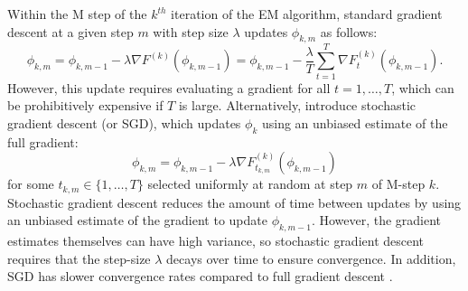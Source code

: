 Within the M step of the $k^{th}$ iteration of the EM algorithm, standard gradient descent at a given step $m$ with step size $\lambda$ updates $\phi_{k,m}$ as follows:
%
\begin{equation}
    \phi_{k,m} = \phi_{k,m-1} - \lambda \nabla F^{(k)}(\phi_{k,m-1}) =  \phi_{k,m-1} - \frac{\lambda}{T} \sum_{t=1}^T \nabla F^{(k)}_t(\phi_{k,m-1}).
\end{equation}
%
However, this update requires evaluating a gradient for all $t = 1,\ldots,T$, which can be prohibitively expensive if $T$ is large. Alternatively, \citet{Robbins:1951} introduce stochastic gradient descent (or SGD), which updates $\phi_k$ using an unbiased estimate of the full gradient:
%
\begin{equation}
    \phi_{k,m} = \phi_{k,m-1} - \lambda \nabla F^{(k)}_{t_{k,m}}(\phi_{k,m-1})
\end{equation}
%
for some $t_{k,m} \in \{1,\ldots,T\}$ selected uniformly at random at step $m$ of M-step $k$. Stochastic gradient descent reduces the amount of time between updates by using an unbiased estimate of the gradient to update $\phi_{k,m-1}$. However, the gradient estimates themselves can have high variance, so stochastic gradient descent requires that the step-size $\lambda$ decays over time to ensure convergence. In addition, SGD has slower convergence rates compared to full gradient descent \citep{Schmidt:2017}.

